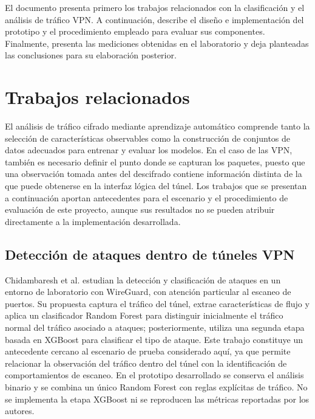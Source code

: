\documentclass[conference]{IEEEtran}
\begin{document}
El documento presenta primero los trabajos relacionados con la clasificación y el análisis de tráfico VPN. A continuación, describe el diseño e implementación del prototipo y el procedimiento empleado para evaluar sus componentes. Finalmente, presenta las mediciones obtenidas en el laboratorio y deja planteadas las conclusiones para su elaboración posterior.

\section{Trabajos relacionados}

El análisis de tráfico cifrado mediante aprendizaje automático comprende tanto la selección de características observables como la construcción de conjuntos de datos adecuados para entrenar y evaluar los modelos. En el caso de las VPN, también es necesario definir el punto donde se capturan los paquetes, puesto que una observación tomada antes del descifrado contiene información distinta de la que puede obtenerse en la interfaz lógica del túnel. Los trabajos que se presentan a continuación aportan antecedentes para el escenario y el procedimiento de evaluación de este proyecto, aunque sus resultados no se pueden atribuir directamente a la implementación desarrollada.

\subsection{Detección de ataques dentro de túneles VPN}
Chidambaresh et al. \cite{ref5} estudian la detección y clasificación de ataques en un entorno de laboratorio con WireGuard, con atención particular al escaneo de puertos. Su propuesta captura el tráfico del túnel, extrae características de flujo y aplica un clasificador Random Forest para distinguir inicialmente el tráfico normal del tráfico asociado a ataques; posteriormente, utiliza una segunda etapa basada en XGBoost para clasificar el tipo de ataque. Este trabajo constituye un antecedente cercano al escenario de prueba considerado aquí, ya que permite relacionar la observación del tráfico dentro del túnel con la identificación de comportamientos de escaneo. En el prototipo desarrollado se conserva el análisis binario y se combina un único Random Forest con reglas explícitas de tráfico. No se implementa la etapa XGBoost ni se reproducen las métricas reportadas por los autores.
\end{document}
